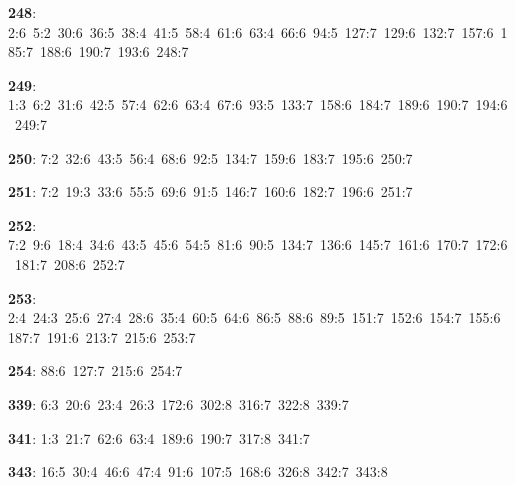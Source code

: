 \noindent \textbf{248}: 2:6\allowbreak\ 5:2\allowbreak\ 30:6\allowbreak\ 36:5\allowbreak\ 38:4\allowbreak\ 41:5\allowbreak\ 58:4\allowbreak\ 61:6\allowbreak\ 63:4\allowbreak\ 66:6\allowbreak\ 94:5\allowbreak\ 127:7\allowbreak\ 129:6\allowbreak\ 132:7\allowbreak\ 157:6\allowbreak\ 185:7\allowbreak\ 188:6\allowbreak\ 190:7\allowbreak\ 193:6\allowbreak\ 248:7\par
\noindent \textbf{249}: 1:3\allowbreak\ 6:2\allowbreak\ 31:6\allowbreak\ 42:5\allowbreak\ 57:4\allowbreak\ 62:6\allowbreak\ 63:4\allowbreak\ 67:6\allowbreak\ 93:5\allowbreak\ 133:7\allowbreak\ 158:6\allowbreak\ 184:7\allowbreak\ 189:6\allowbreak\ 190:7\allowbreak\ 194:6\allowbreak\ 249:7\par
\noindent \textbf{250}: 7:2\allowbreak\ 32:6\allowbreak\ 43:5\allowbreak\ 56:4\allowbreak\ 68:6\allowbreak\ 92:5\allowbreak\ 134:7\allowbreak\ 159:6\allowbreak\ 183:7\allowbreak\ 195:6\allowbreak\ 250:7\par
\noindent \textbf{251}: 7:2\allowbreak\ 19:3\allowbreak\ 33:6\allowbreak\ 55:5\allowbreak\ 69:6\allowbreak\ 91:5\allowbreak\ 146:7\allowbreak\ 160:6\allowbreak\ 182:7\allowbreak\ 196:6\allowbreak\ 251:7\par
\noindent \textbf{252}: 7:2\allowbreak\ 9:6\allowbreak\ 18:4\allowbreak\ 34:6\allowbreak\ 43:5\allowbreak\ 45:6\allowbreak\ 54:5\allowbreak\ 81:6\allowbreak\ 90:5\allowbreak\ 134:7\allowbreak\ 136:6\allowbreak\ 145:7\allowbreak\ 161:6\allowbreak\ 170:7\allowbreak\ 172:6\allowbreak\ 181:7\allowbreak\ 208:6\allowbreak\ 252:7\par
\noindent \textbf{253}: 2:4\allowbreak\ 24:3\allowbreak\ 25:6\allowbreak\ 27:4\allowbreak\ 28:6\allowbreak\ 35:4\allowbreak\ 60:5\allowbreak\ 64:6\allowbreak\ 86:5\allowbreak\ 88:6\allowbreak\ 89:5\allowbreak\ 151:7\allowbreak\ 152:6\allowbreak\ 154:7\allowbreak\ 155:6\allowbreak\ 187:7\allowbreak\ 191:6\allowbreak\ 213:7\allowbreak\ 215:6\allowbreak\ 253:7\par
\noindent \textbf{254}: 88:6\allowbreak\ 127:7\allowbreak\ 215:6\allowbreak\ 254:7\par
\noindent \textbf{339}: 6:3\allowbreak\ 20:6\allowbreak\ 23:4\allowbreak\ 26:3\allowbreak\ 172:6\allowbreak\ 302:8\allowbreak\ 316:7\allowbreak\ 322:8\allowbreak\ 339:7\par
\noindent \textbf{341}: 1:3\allowbreak\ 21:7\allowbreak\ 62:6\allowbreak\ 63:4\allowbreak\ 189:6\allowbreak\ 190:7\allowbreak\ 317:8\allowbreak\ 341:7\par
\noindent \textbf{343}: 16:5\allowbreak\ 30:4\allowbreak\ 46:6\allowbreak\ 47:4\allowbreak\ 91:6\allowbreak\ 107:5\allowbreak\ 168:6\allowbreak\ 326:8\allowbreak\ 342:7\allowbreak\ 343:8\par
